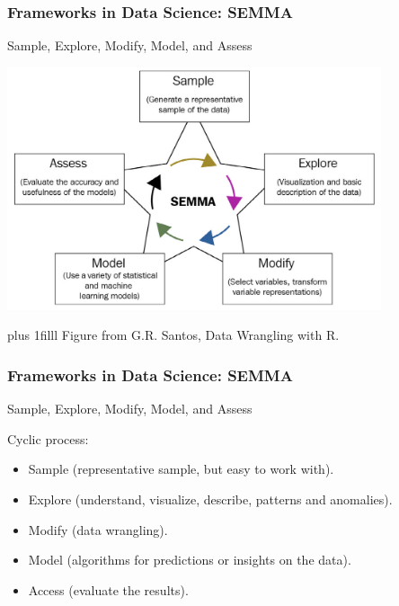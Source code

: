 \documentclass{beamer}
\newcommand{\btVFill}{\vskip0pt plus 1filll}
\begin{document}
	\begin{frame}
		\frametitle{Frameworks in Data Science: SEMMA}

		Sample, Explore, Modify, Model, and Assess

		\includegraphics[width=11cm]{Santos_1_7.png}

		\btVFill
		\tiny{Figure from G.R. Santos, Data Wrangling with R.}

	\end{frame}

	\begin{frame}
		\frametitle{Frameworks in Data Science: SEMMA}

		Sample, Explore, Modify, Model, and Assess

		\vspace{2em}

		Cyclic process:
		\begin{itemize}
			\item Sample (representative sample, but easy to work with).
			\item Explore (understand, visualize, describe, patterns and anomalies).
			\item Modify (data wrangling).
			\item Model (algorithms for predictions or insights on the data).
			\item Access (evaluate the results).
		\end{itemize}

	\end{frame}
\end{document}
